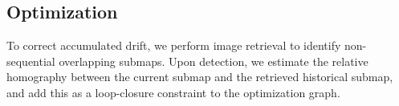 \subsection{Optimization}
To correct accumulated drift, we perform image retrieval to identify non-sequential overlapping submaps. Upon detection, we estimate the relative homography between the current submap and the retrieved historical submap, and add this as a loop-closure constraint to the optimization graph.

